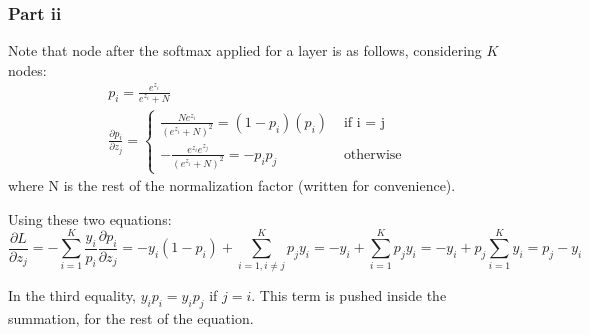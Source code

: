 \documentclass{article}
\begin{document}
\subsubsection*{Part ii}
\begin{flushleft}
Note that node after the softmax applied for a layer is as follows, considering \(K\) nodes:
\begin{gather}
p_{i} = \frac{e^{z_{i}}}{e^{z_{i}} + N} \\
\frac{\partial p_{i}}{\partial z_{j}} = \begin{cases} \frac{Ne^{z_{i}}}{(e^{z_{i}} + N)^2} = (1 - p_{i})(p_{i}) & \text{ if i = j } \\ -\frac{e^{z_{i}}e^{z_{j}}}{(e^{z_{i}} + N)^2} = -p_{i}p_{j} & \text{ otherwise } \end{cases}
\end{gather}
where N is the rest of the normalization factor (written for convenience).

Using these two equations:
\begin{equation}
\frac{\partial L}{\partial z_{j}} = -\displaystyle \sum_{i=1}^{K} \frac{y_{i}}{p_{i}} \frac{\partial p_{i}}{\partial z_{j}} = -y_{i}(1 - p_{i}) + \sum_{i=1 , i \neq j}^{K} p_{j}y_{i} = -y_{i} + \sum_{i=1}^{K} p_{j}y_{i} = -y_{i} + p_{j}\sum_{i=1}^{K}y_{i} = \boxed{p_{j} - y_{i}}
\end{equation}

In the third equality, \(y_{i}p_{i} = y_{i}p_{j}\) if \(j = i\). This term is pushed inside the summation, for the rest of the equation.
\end{flushleft}
\end{document}

